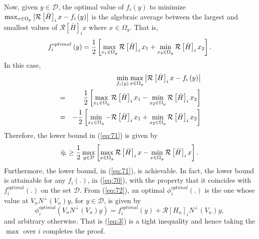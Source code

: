 \documentclass[letterpaper, 10 pt, conference]{ieeeconf}
\begin{document}
Now, given $y\in \mathcal{D}$, the optimal value of $f_{i}\left( y\right) $
to minimize $\max_{{\normalsize x\in \Omega }_{y}}\left\vert \mathcal{R}%
\left[ \bar{H}\right] _{i}x-f_{i}\left( y\right) \right\vert $ is the
algebraic average between the largest and smallest values of $\mathcal{R}%
\left[ \bar{H}\right] _{i}x$ where $x\in \Omega _{y}$. That is,%
\begin{equation}
f_{i}^{optimal}\left( y\right) =\frac{1}{2}\left[ \max_{x_{1}{\normalsize %
\in \Omega }_{y}}\mathcal{R}\left[ \bar{H}\right] _{i}x_{1}+\min_{x_{2}%
{\normalsize \in \Omega }_{y}}\mathcal{R}\left[ \bar{H}\right] _{i}x_{2}%
\right] .  \label{eq:opt1}
\end{equation}%
In this case,%
\begin{eqnarray*}
&&\min_{f_{i}\left( y\right) }\max_{x{\normalsize \in \Omega }%
_{y}}\left\vert \mathcal{R}\left[ \bar{H}\right] _{i}x-f_{i}\left( y\right)
\right\vert \\
&=&\frac{1}{2}\left[ \max_{x_{1}{\normalsize \in \Omega }_{y}}\mathcal{R}%
\left[ \bar{H}\right] _{i}x_{1}-\min_{x_{2}{\normalsize \in \Omega }_{y}}%
\mathcal{R}\left[ \bar{H}\right] _{i}x_{2}\right] \\
&=&-\frac{1}{2}\left[ \min_{x_{1}{\normalsize \in \Omega }_{y}}-\mathcal{R}%
\left[ \bar{H}\right] _{i}x_{1}+\min_{x_{2}{\normalsize \in \Omega }_{y}}%
\mathcal{R}\left[ \bar{H}\right] _{i}x_{2}\right]
\end{eqnarray*}%
Therefore, the lower bound in (\ref{eq:71}) is given by%
\begin{equation}
\bar{\eta}_{i}\geq \frac{1}{2}\max_{y\in \mathcal{D}}\left[ \max_{x%
{\normalsize \in \Omega }_{y}}\mathcal{R}\left[ \bar{H}\right] _{i}x-\min_{x%
{\normalsize \in \Omega }_{y}}\mathcal{R}\left[ \bar{H}\right] _{i}x\right] .
\label{eq:3}
\end{equation}%
Furthermore, the lower bound, in (\ref{eq:71}), is achievable. In fact, the
lower bound is attainable for any $f_{i}\left( .\right) $, in (\ref{eq:70}),
with the property that it coincides with $f_{i}^{optimal}\left( .\right) $
on the set $\mathcal{D}$. From (\ref{eq:72}), an optimal $\phi
_{i}^{optimal}\left( .\right) $ is the one whose value at $V_{n}N^{\bot
}\left( V_{n}\right) y$, for $y\in \mathcal{D}$, is given by 
\begin{equation}
\phi _{i}^{optimal}\left( V_{n}N^{\bot }\left( V_{n}\right) y\right)
=f_{i}^{optimal}\left( y\right) +\mathcal{R}\left[ H_{n}\right] _{i}N^{\bot
}\left( V_{n}\right) y,  \label{eq:opt2}
\end{equation}%
and arbitrary otherwise. That is (\ref{eq:3}) is a tight inequality and
hence taking the $\max $ over $i$ completes the proof.
\end{document}
